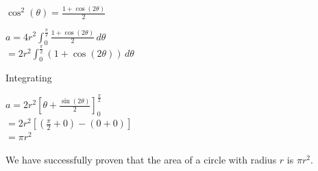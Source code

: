 \documentclass{article}
\begin{document}
\begin{center}
$\cos^2(\theta) = \frac{1 + \cos(2\theta)}{2}$
\end{center}
\begin{center}
$a = 4r^2 \int_0^{\frac{\pi}{2}} \frac{1 + \cos(2\theta)}{2} \, d\theta$
\\
$= 2r^2 \int_0^{\frac{\pi}{2}} (1 + \cos(2\theta)) \, d\theta$
\end{center}
Integrating
\begin{center}
$a = 2r^2 \left[ \theta + \frac{\sin(2\theta)}{2} \right]_0^{\frac{\pi}{2}}$
\\
$= 2r^2 \left[ \left( \frac{\pi}{2} + 0 \right) - (0 + 0) \right]$
\\
$= \pi r^2$
\end{center}
We have successfully proven that the area of a circle with radius $r$ is $\pi r^2$.

\label{end}
\end{document}
